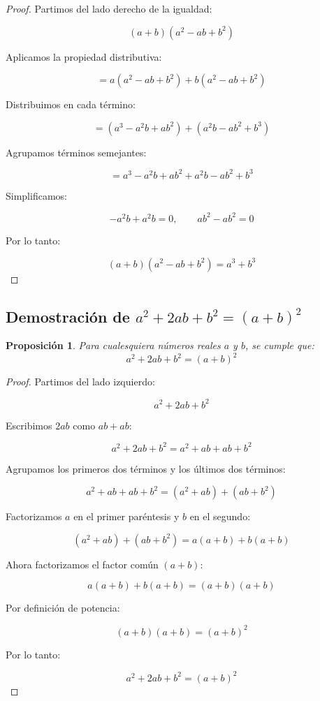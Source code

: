 \documentclass[12pt,final]{report}
\theoremstyle{plain}
\newtheorem{proposition}[theorem]{Proposición}
\theoremstyle{definition}
\begin{document}
\begin{proof}

Partimos del lado derecho de la igualdad:

\[
(a+b)(a^2 - ab + b^2)
\]

Aplicamos la propiedad distributiva:

\[
= a(a^2 - ab + b^2) + b(a^2 - ab + b^2)
\]

Distribuimos en cada término:

\[
= (a^3 - a^2b + ab^2) + (a^2b - ab^2 + b^3)
\]

Agrupamos términos semejantes:

\[
= a^3 - a^2b + ab^2 + a^2b - ab^2 + b^3
\]

Simplificamos:

\[
-a^2b + a^2b = 0, \qquad ab^2 - ab^2 = 0
\]

Por lo tanto:

\[
(a+b)(a^2 - ab + b^2) = a^3 + b^3
\]

\end{proof}

\newpage


\subsection{Demostración de $a^2+2ab+b^2=(a+b)^2$}

\begin{proposition}
Para cualesquiera números reales $a$ y $b$, se cumple que:
\[
a^2+2ab+b^2=(a+b)^2
\]
\end{proposition}

\begin{proof}

Partimos del lado izquierdo:

\[
a^2+2ab+b^2
\]

Escribimos $2ab$ como $ab+ab$:

\[
a^2+2ab+b^2 = a^2+ab+ab+b^2
\]

Agrupamos los primeros dos términos y los últimos dos términos:

\[
a^2+ab+ab+b^2 = (a^2+ab)+(ab+b^2)
\]

Factorizamos $a$ en el primer paréntesis y $b$ en el segundo:

\[
(a^2+ab)+(ab+b^2)=a(a+b)+b(a+b)
\]

Ahora factorizamos el factor común $(a+b)$:

\[
a(a+b)+b(a+b)=(a+b)(a+b)
\]

Por definición de potencia:

\[
(a+b)(a+b)=(a+b)^2
\]

Por lo tanto:

\[
a^2+2ab+b^2=(a+b)^2
\]

\end{proof}
\end{document}
